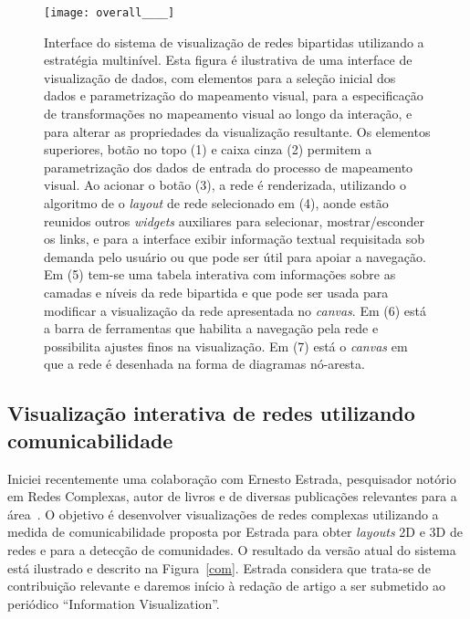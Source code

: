 \documentclass[a4paper, 11pt]{article}
\begin{document}
\begin{figure}[h!]
\centering
  \texttt{[image: overall\_\_\_\_]}
\caption{%
  Interface do sistema de visualização de redes bipartidas utilizando a estratégia multinível.
  Esta figura é ilustrativa de uma interface de visualização de dados, com elementos para a seleção inicial dos dados e parametrização do mapeamento visual, para a especificação de transformações no mapeamento visual ao longo da interação, e para alterar as propriedades da visualização resultante.
  Os elementos superiores, botão no topo (1) e caixa cinza (2) permitem a parametrização dos dados de entrada do processo de mapeamento visual.
  Ao acionar o botão (3), a rede é renderizada, utilizando o algoritmo de o \emph{layout} de rede selecionado em (4), aonde estão reunidos outros \emph{widgets} auxiliares para selecionar,
  mostrar/esconder os links,
  e para a interface exibir informação textual requisitada sob demanda
  pelo usuário ou que pode ser útil para apoiar a navegação.
  Em (5) tem-se uma tabela interativa com informações sobre as camadas e níveis
  da rede bipartida e que pode ser usada para modificar a visualização da rede apresentada no \emph{canvas}.
  Em (6) está a barra de ferramentas que habilita a navegação pela rede e
  possibilita ajustes finos na visualização.
  Em (7) está o \emph{canvas} em que a rede é desenhada na forma de diagramas nó-aresta.
}\label{ml}
\end{figure}


\subsection{Visualização interativa de redes utilizando comunicabilidade}\label{scom}
Iniciei recentemente uma colaboração com Ernesto Estrada, pesquisador notório em Redes Complexas, autor de livros e de diversas publicações relevantes para a área~\cite{ern1,ern2,ern3,ern4}.
O objetivo é desenvolver visualizações de redes complexas utilizando a medida de comunicabilidade proposta por Estrada para obter \textit{layouts} 2D e 3D de redes e para a detecção de comunidades. O resultado da versão atual do sistema está ilustrado e descrito na Figura~\ref{com}.
Estrada considera que trata-se de contribuição relevante e daremos início à redação de artigo a ser submetido ao periódico ``Information Visualization''.
\end{document}
